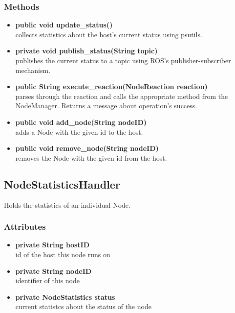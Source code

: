 \subsubsection{Methods}
\begin{itemize}
	\item \textbf{public void update\_status()}\\
			collects statistics about the host's current status using psutils.
	\item \textbf{private void publish\_status(String topic)}\\
			publishes the current status to a topic using ROS's publisher-subscriber mechanism.
	\item \textbf{public String execute\_reaction(NodeReaction reaction)}\\
			parses through the reaction and calls the appropriate method from the NodeManager.
			Returns a message about operation's success.
	\item \textbf{public void add\_node(String nodeID)}\\
			adds a Node with the given id to the host.
	\item \textbf{public void remove\_node(String nodeID)}\\
			removes the Node with the given id from the host.
\end{itemize}

\subsection{NodeStatisticsHandler}
Holds the statistics of an individual Node.

\subsubsection{Attributes}
\begin{itemize}
	\item \textbf{private String hostID}\\
	id of the host this node runs on
	\item \textbf{private String nodeID}\\
	identifier of this node
	\item \textbf{private NodeStatistics status}\\
	current statistcs about the status of the node
\end{itemize}

